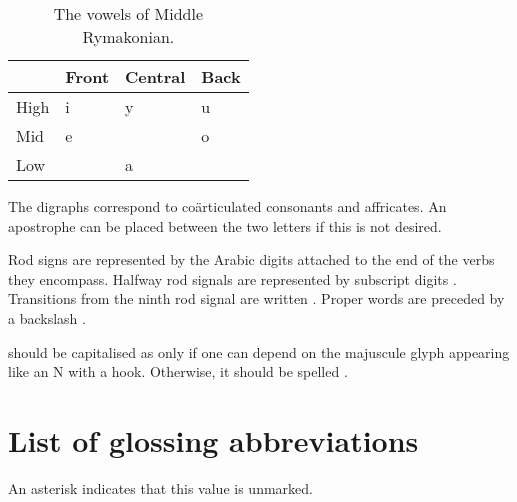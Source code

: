 \documentclass{book}
\newcommand{\lname}{Middle Rymakonian}
\begin{document}
\begin{table}[h]
  \centering
    \caption{The vowels of \lname.}
    \begin{tabular}{l|lll}
        & Front & Central & Back \\
        \hline
        High & i & y & u \\
        Mid & e & & o \\
        Low & & a & \\
    \end{tabular}
\end{table}

The digraphs  correspond to coärticulated consonants and affricates. An apostrophe can be placed between the two letters if this is not desired.

Rod signs are represented by the Arabic digits  attached to the end of the verbs they encompass. Halfway rod signals are represented by subscript digits . Transitions from the ninth rod signal are written . Proper words are preceded by a backslash \ortho{\bs{}}.

 should be capitalised as  only if one can depend on the majuscule glyph appearing like an N with a hook. Otherwise, it should be spelled .

\chapter{List of glossing abbreviations}

An asterisk indicates that this value is unmarked.
\end{document}

